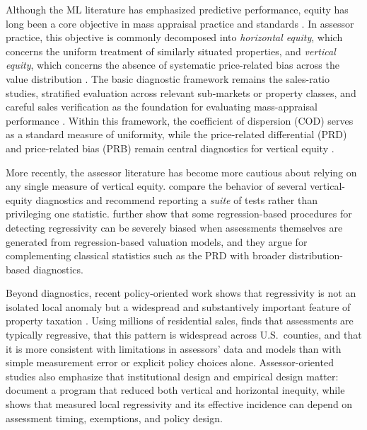 \documentclass[12pt, draft]{article}
\theoremstyle{plain}
\theoremstyle{definition}
\newcommand{\1}{\mathbf{1}}
\begin{document}
Although the ML literature has emphasized predictive performance, equity has long been a core objective in mass appraisal practice and standards \cite{IAAO2013Ratio,IAAO2025Mass,Quintos2014}. In assessor practice, this objective is commonly decomposed into \emph{horizontal equity}, which concerns the uniform treatment of similarly situated properties, and \emph{vertical equity}, which concerns the absence of systematic price-related bias across the value distribution \cite{10578d49-78f8-3ef9-8277-9b6add2bd071,cornia2006property,McMillenSingh2023}. The basic diagnostic framework remains the sales-ratio studies, stratified evaluation across relevant sub-markets or property classes, and careful sales verification as the foundation for evaluating mass-appraisal performance \cite{IAAO2013Ratio,IAAO2020SalesVerification,IAAO2025Mass}. Within this framework, the coefficient of dispersion (COD) serves as a standard measure of uniformity, while the price-related differential (PRD) and price-related bias (PRB) remain central diagnostics for vertical equity \cite{IAAO2013Ratio,IAAO2025Mass}.


More recently, the assessor literature has become more cautious about relying on any single measure of vertical equity. \textcite{IAAO2023VerticalReview} compare the behavior of several vertical-equity diagnostics and recommend reporting a \emph{suite} of tests rather than privileging one statistic. \textcite{McMillenSingh2023} further show that some regression-based procedures for detecting regressivity can be severely biased when assessments themselves are generated from regression-based valuation models, and they argue for complementing classical statistics such as the PRD with broader distribution-based diagnostics.




Beyond diagnostics, recent policy-oriented work shows that regressivity is not an isolated local anomaly but a widespread and substantively important feature of property taxation \cite{Berry2021,AvenancioLeonHoward2022}. Using millions of residential sales, \textcite{Berry2021} finds that assessments are typically regressive, that this pattern is widespread across U.S.\ counties, and that it is more consistent with limitations in assessors' data and models than with simple measurement error or explicit policy choices alone. Assessor-oriented studies also emphasize that institutional design and empirical design matter: \textcite{ScottDaigle2022} document a program that reduced both vertical and horizontal inequity, while \textcite{Rakow2023, Rakow2024} shows that measured local regressivity and its effective incidence can depend on assessment timing, exemptions, and policy design.
\end{document}
